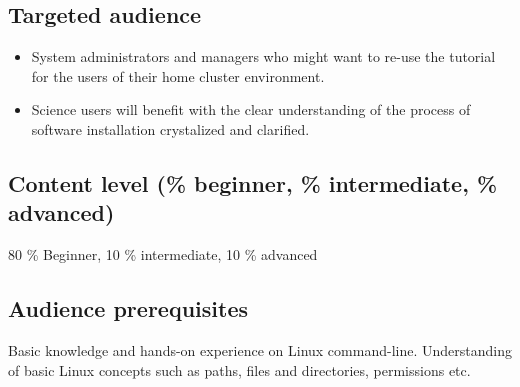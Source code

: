\documentclass{report}
\begin{document}
\subsection*{Targeted audience}
\begin{itemize}
\item System administrators and managers who might want to re-use the tutorial for the users of their home cluster environment.
\item Science users will benefit with the clear understanding of the process of software installation crystalized and clarified.
\end{itemize}
\subsection*{Content level (\% beginner, \% intermediate, \% advanced)}
80 \% Beginner, 10 \% intermediate, 10 \% advanced
\subsection*{Audience prerequisites}
Basic knowledge and hands-on experience on Linux command-line. Understanding of
basic Linux concepts such as paths, files and directories, permissions etc.
\end{document}
